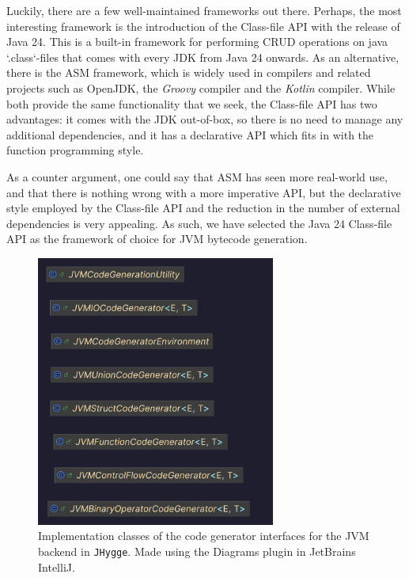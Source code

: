 Luckily, there are a few well-maintained frameworks out there. Perhaps, the most interesting framework is the introduction of the
Class-file\cite{jep484} API with the release of Java 24. This is a built-in framework for performing CRUD operations on java `.class`-files
that comes with every JDK from Java 24 onwards. As an alternative, there is the ASM framework\cite{asm}, which is widely used in compilers
and related projects such as OpenJDK, the \textit{Groovy} compiler and the \textit{Kotlin} compiler. While both provide the
same functionality that we seek, the Class-file API has two advantages: it comes with the JDK out-of-box, so there is no
need to manage any additional dependencies, and it has a declarative API which fits in with the function programming style.

As a counter argument, one could say that ASM has seen more real-world use, and that there is nothing wrong with a more imperative
API, but the declarative style employed by the Class-file API and the reduction in the number of external dependencies is very
appealing. As such, we have selected the Java 24 Class-file API as the framework of choice for JVM bytecode generation.

\begin{figure}[H]
\centering
\includegraphics[width=0.7\textwidth]{Pictures/Diagrams/jvm_codegenerator_classes.png}
\caption{Implementation classes of the code generator interfaces for the JVM backend in \texttt{JHygge}. Made using the Diagrams plugin in JetBrains IntelliJ.}
\label{fig:jvm_codegenerator_classes}
\end{figure}

